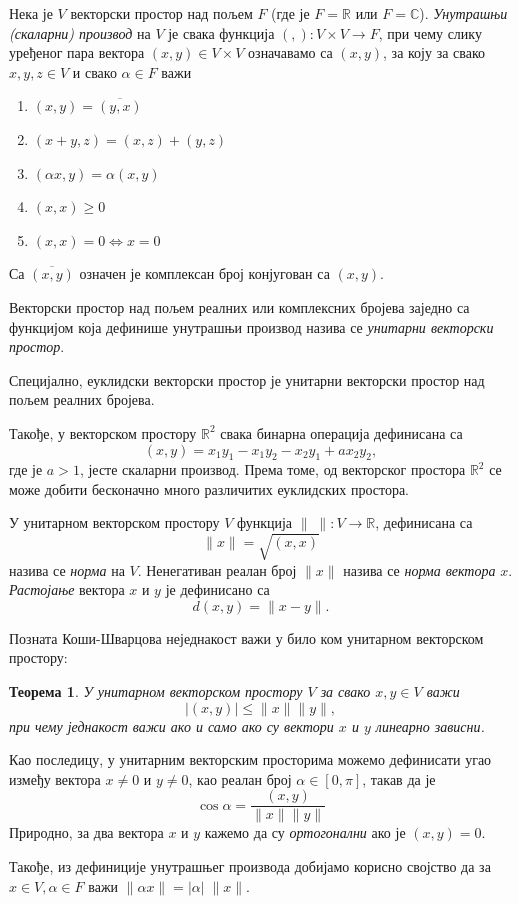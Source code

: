 \documentclass{report}
\theoremstyle{plain}
\newtheorem{thm}{Теорема}
\theoremstyle{definition}
\begin{document}
Нека је $V$ векторски простор над пољем $F$ (где је $F=\mathbb{R}$ или $F=\mathbb{C}$). \emph{Унутрашњи (скаларни) производ} на $V$ је свака функција $(,):V\times V\to F$, при чему слику уређеног пара вектора $(x, y)\in V\times V$ означавамо са $(x, y)$, за коју за свако $x, y, z\in V$ и свако $\alpha \in F$ важи
\begin{enumerate}
  \item $(x, y) = \overline{(y, x)}$
  \item $(x+y, z) = (x, z)+(y, z)$
  \item $(\alpha x, y) = \alpha (x, y)$
  \item $(x, x)\geq 0$
  \item $(x, x) = 0 \Leftrightarrow x=0$
\end{enumerate}
Са $\overline{(x, y)}$ означен је комплексан број конјугован са $(x, y)$.

Векторски простор над пољем реалних или комплексних бројева заједно са функцијом која дефинише унутрашњи производ назива се \emph{унитарни векторски простор}.

Специјално, еуклидски векторски простор је унитарни векторски простор над пољем реалних бројева. 

Такође, у векторском простору $\mathbb{R}^2$ свака бинарна операција дефинисана са
$$(x, y) = x_1y_1 - x_1y_2 - x_2y_1 +ax_2y_2,$$
где је $a>1$, јесте скаларни производ. Према томе, од векторског простора $\mathbb{R}^2$ се може добити бесконачно много различитих еуклидских простора.

У унитарном векторском простору $V$ функција $\|\;\|:V\to \mathbb{R}$, дефинисана са $$\|x\| = \sqrt{(x, x)}$$ назива се \emph{норма} на $V$. Ненегативан реалан број $\|x\|$ назива се \emph{норма вектора} $x$.
\emph{Растојање} вектора $x$ и $y$ је дефинисано са $$d(x, y) = \|x-y\|.$$

Позната Коши-Шварцова неједнакост важи у било ком унитарном векторском простору:
\begin{thm}
У унитарном векторском простору $V$ за свако $x, y\in V$ важи
$$|(x, y)|\leq\|x\|\|y\|,$$
при чему једнакост важи ако и само ако су вектори $x$ и $y$ линеарно зависни.
\end{thm}
Као последицу, у унитарним векторским просторима можемо дефинисати угао између вектора $x\neq 0$ и $y\neq 0$, као реалан број $\alpha\in [0, \pi]$, такав да је $$\cos \alpha = \frac{(x, y)}{\|x\|\|y\|}$$
Природно, за два вектора $x$ и $y$ кажемо да су \emph{ортогонални} ако је $(x, y) = 0$.

Такође, из дефиниције унутрашњег производа добијамо корисно својство да за $x\in V, \alpha \in F$ важи $\|\alpha x\| = |\alpha|\; \|x\|$.
\end{document}
